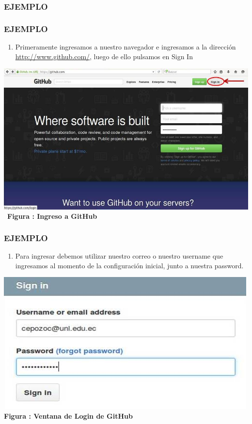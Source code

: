 \documentclass[8pt]{beamer}
\begin{document}
\subsubsection{EJEMPLO}
\begin{frame}
\frametitle{EJEMPLO}
\begin{enumerate}[1. ]
	\justifying
    \item Primeramente ingresamos a nuestro navegador e ingresamos a la dirección \url{http://www.github.com/}, luego de ello pulsamos en Sign In
\end{enumerate}
\begin{center}
\includegraphics[width=9 cm]{img/b1}\
\textbf{Figura : Ingreso a GitHub}
\end{center}
\end{frame}

\begin{frame}
\frametitle{EJEMPLO}
\begin{enumerate}[2. ]
	\justifying
    \item Para ingresar debemos utilizar nuestro correo o nuestro username que ingresamos al momento de la configuración inicial, junto a nuestra password.
\end{enumerate}
\begin{center}
\includegraphics[width=9 cm]{img/b2}\\
\textbf{Figura : Ventana de Login de GitHub}
\end{center}
\end{frame}
\end{document}
